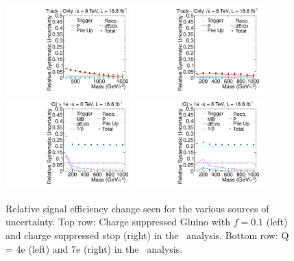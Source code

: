 \begin{figure}[ht]
\centering
  \includegraphics[clip=true, trim=0.0cm 0cm 2.8cm 0cm, width=0.44\textwidth]{figures/tkonly/TkGluinoN_f10Uncertainty}
  \includegraphics[clip=true, trim=0.0cm 0cm 2.8cm 0cm, width=0.44\textwidth]{figures/tkonly/TkStopNUncertainty}\\
  \includegraphics[clip=true, trim=0.0cm 0cm 2.8cm 0cm, width=0.44\textwidth]{figures/multi/HQDY_Q4Uncertainty}
  \includegraphics[clip=true, trim=0.0cm 0cm 2.8cm 0cm, width=0.44\textwidth]{figures/multi/HQDY_Q7Uncertainty}\\
\caption[Relative signal efficiency change seen for the various sources of uncertainty for some of the models considered in the \tkonly\ and \tktof\ analyses]
{Relative signal efficiency change seen for the various sources of uncertainty.
Top row: Charge suppressed Gluino with $f=0.1$ (left) and charge suppressed stop (right) in the \tkonly\ analysis.
Bottom row: Q = 4e (left) and 7e (right) in the \multi\ analysis.}
    \label{fig:TkOnMCUncSource}
\end{figure}

